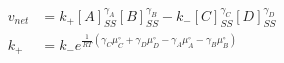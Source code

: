 
\begin{eqnarray}
v_{net} & = k_+[A]_{SS}^{\gamma_A}[B]_{SS}^{\gamma_B} - k_-[C]_{SS}^{\gamma_C}[D]_{SS}^{\gamma_D} \\
k_+ &=  k_-e^{\frac{1}{RT}\left(\gamma_C\mu_C^\circ+ \gamma_D\mu_D^\circ -\gamma_A\mu_A^\circ-\gamma_B\mu_B^\circ\right)} \\
\end{eqnarray}
